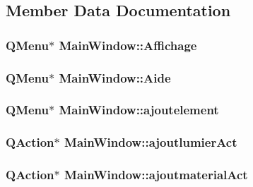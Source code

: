 \subsection{Member Data Documentation}
\hypertarget{class_main_window_a77f24d5ff1220ea72f7730d20672911c}{
\subsubsection[{Affichage}]{\setlength{\rightskip}{0pt plus 5cm}Q\+Menu$\ast$ Main\+Window\+::\+Affichage\hspace{0.3cm}{\ttfamily [private]}}}\label{class_main_window_a77f24d5ff1220ea72f7730d20672911c}
\hypertarget{class_main_window_ab9d17ad44a1ac962e46ac4af1a5732a0}{
\subsubsection[{Aide}]{\setlength{\rightskip}{0pt plus 5cm}Q\+Menu$\ast$ Main\+Window\+::\+Aide\hspace{0.3cm}{\ttfamily [private]}}}\label{class_main_window_ab9d17ad44a1ac962e46ac4af1a5732a0}
\hypertarget{class_main_window_a6c2ded3bdffc863604d7890c554578d5}{
\subsubsection[{ajoutelement}]{\setlength{\rightskip}{0pt plus 5cm}Q\+Menu$\ast$ Main\+Window\+::ajoutelement\hspace{0.3cm}{\ttfamily [private]}}}\label{class_main_window_a6c2ded3bdffc863604d7890c554578d5}
\hypertarget{class_main_window_a04b22ecfd14e02f1dd5a5dd77b509f8e}{
\subsubsection[{ajoutlumier\+Act}]{\setlength{\rightskip}{0pt plus 5cm}Q\+Action$\ast$ Main\+Window\+::ajoutlumier\+Act\hspace{0.3cm}{\ttfamily [private]}}}\label{class_main_window_a04b22ecfd14e02f1dd5a5dd77b509f8e}
\hypertarget{class_main_window_ae531eca2b9941c7f260f466edd97790e}{
\subsubsection[{ajoutmaterial\+Act}]{\setlength{\rightskip}{0pt plus 5cm}Q\+Action$\ast$ Main\+Window\+::ajoutmaterial\+Act\hspace{0.3cm}{\ttfamily [private]}}}\label{class_main_window_ae531eca2b9941c7f260f466edd97790e}
